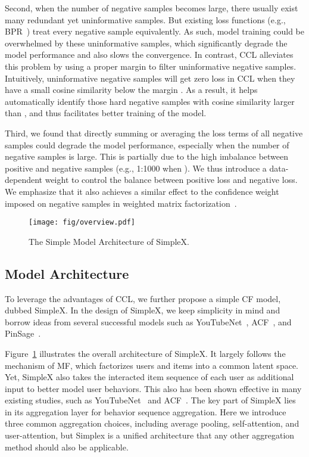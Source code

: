 \documentclass[sigconf,authorversion]{acmart}
\begin{document}
Second, when the number of negative samples becomes large, there usually exist many redundant yet uninformative samples. But existing loss functions (e.g., BPR~\cite{BPR}) treat every negative sample equivalently. As such, model training could be overwhelmed by these uninformative samples, which significantly degrade the model performance and also slows the convergence. In contrast, CCL alleviates this problem by using a proper margin  to filter uninformative negative samples. Intuitively, uninformative negative samples will get zero loss in CCL when they have a small cosine similarity below the margin . As a result, it helps automatically identify those hard negative samples with cosine similarity larger than , and thus facilitates better training of the model. 

Third, we found that directly summing or averaging the loss terms of all negative samples could degrade the model performance, especially when the number of negative samples is large. This is partially due to the high imbalance between positive and negative samples (e.g., 1:1000 when ). We thus introduce a data-dependent weight  to control the balance between positive loss and negative loss. We emphasize that it also achieves a similar effect to the confidence weight imposed on negative samples in weighted matrix factorization~\cite{WMF}.














\begin{figure}[!t]
    \begin{center}
\texttt{[image: fig/overview.pdf]}
    \end{center}
\caption{The Simple Model Architecture of SimpleX.}
    \label{fig:overview}
\end{figure}


\subsection{Model Architecture}
\label{simplecf}
To leverage the advantages of CCL, we further propose a simple CF model, dubbed SimpleX. In the design of SimpleX, we keep simplicity in mind and borrow ideas from several successful models such as YouTubeNet~\cite{YouTubeNet}, ACF~\cite{ACF}, and PinSage~\cite{PinSage}. 


Figure~\ref{fig:overview} illustrates the overall architecture of SimpleX. It largely follows the mechanism of MF, which factorizes users and items into a common latent space. Yet, SimpleX also takes the interacted item sequence of each user as additional input to better model user behaviors. This also has been shown effective in many existing studies, such as YouTubeNet~\cite{YouTubeNet} and ACF~\cite{ACF}. The key part of SimpleX lies in its aggregation layer for behavior sequence aggregation. 
Here we introduce three common aggregation choices, including average pooling, self-attention, and user-attention, but Simplex is a unified architecture that any other aggregation method should also be applicable.
\end{document}

